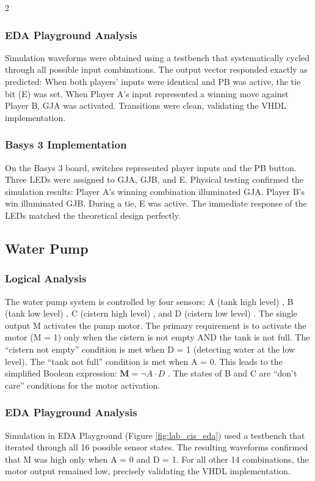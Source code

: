 \documentclass{article}
\begin{document}
\begin{multicols}{2}
\subsubsection{EDA Playground Analysis}
Simulation waveforms were obtained using a testbench that systematically cycled through all possible input combinations. The output vector responded exactly as predicted: When both players’ inputs were identical and PB was active, the tie bit (E) was set. When Player A’s input represented a winning move against Player B, GJA was activated. Transitions were clean, validating the VHDL implementation. 

\subsubsection{Basys 3 Implementation}
On the Basys 3 board, switches represented player inputs and the PB button. Three LEDs were assigned to GJA, GJB, and E. Physical testing confirmed the simulation results: Player A’s winning combination illuminated GJA. Player B’s win illuminated GJB. During a tie, E was active. The immediate response of the LEDs matched the theoretical design perfectly. 

\subsection{Water Pump}
\subsubsection{Logical Analysis}
The water pump system is controlled by four sensors: A (tank high level) , B (tank low level) , C (cistern high level) , and D (cistern low level) . The single output M activates the pump motor. The primary requirement is to activate the motor (M = 1) only when the cistern is not empty AND the tank is not full. The “cistern not empty” condition is met when D = 1 (detecting water at the low level). The “tank not full” condition is met when A = 0. This leads to the simplified Boolean expression: $\mathbf{M} = \neg A \cdot D$ . The states of B and C are “don’t care” conditions for the motor activation. 

\subsubsection{EDA Playground Analysis}
Simulation in EDA Playground (Figure \ref{fig:lab_cis_eda}) used a testbench that iterated through all 16 possible sensor states. The resulting waveforms confirmed that M was high only when A = 0 and D = 1. For all other 14 combinations, the motor output remained low, precisely validating the VHDL implementation. 


\end{multicols}
\end{document}
